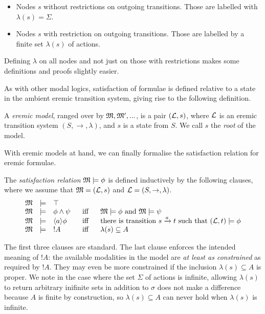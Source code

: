 \begin{itemize}

\item Nodes $s$ without restrictions on outgoing transitions. Those are
  labelled with $\lambda ( s) = \Sigma$.

\item Nodes $s$ with restriction on outgoing transitions. Those are
  labelled by a finite set $\lambda ( s)$ of actions.

\end{itemize}

\NI Defining $\lambda$ on all nodes and not just on those with
restrictions makes some definitions and proofs slightly easier.

As with other modal logics, satisfaction of formulae is defined
relative to a state in the ambient eremic transition system, giving
rise to the following definition.

\begin{definition}
A \emph{eremic model}, ranged over by $\frak{M}, \frak{M}', ...$, is a pair
$(\mathcal{L}, s)$, where $\mathcal{L}$ is an eremic transition system $(S,
\rightarrow, \lambda)$, and $s$ is a state from $S$. We call $s$ the
\emph{root} of the model.
\end{definition}

\NI With eremic models at hand, we can finally formalise the
satisfaction relation for eremic formulae.

\begin{definition}\label{ELsatisfaction}
The \emph{satisfaction relation} $\frak{M} \models \phi$ is defined
inductively by the following clauses, where we assume that $\frak{M} =
(\mathcal{L}, s)$ and $\mathcal{L} = (S, \rightarrow, \lambda)$.
\[
\begin{array}{lclcl}
  \frak{M} & \models & \top   \\
  \frak{M} & \models & \phi \land \psi &\ \mbox{ iff } \ & \frak{M}  \models \phi \mbox { and } \frak{M} \models \psi  \\
  \frak{M} & \models & \langle a \rangle \phi & \mbox{ iff } & \text{there is transition } s \xrightarrow{a} t \mbox { such that } (\mathcal{L}, t) \models \phi  \\
  \frak{M} & \models & ! A &\mbox{ iff } & \lambda(s) \subseteq A
\end{array}
\]
\end{definition}

\NI The first three clauses are standard. The last clause enforces the
intended meaning of $!A$: the available modalities in the model are
\emph{at least as constrained} as required by $!A$. They may even be
more constrained if the inclusion $\lambda(s) \subseteq A$ is
proper. We note in the case where the set $\Sigma$ of actions is
infinite, allowing $\lambda(s)$ to return arbitrary inifinite sets in
addition to $\sigma$ does not make a difference because $A$ is finite
by construction, so $\lambda(s) \subseteq A$ can never hold when
$\lambda(s)$ is infinite. 

